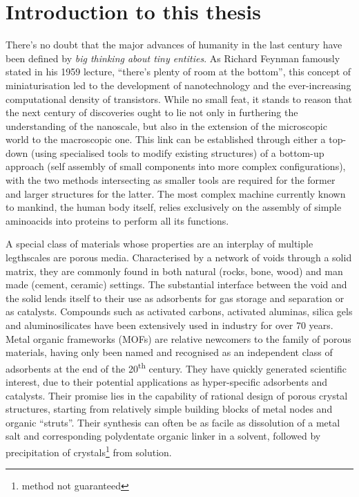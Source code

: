 
\graphicspath{ {\thisch/figures/} }

\chapter*{Introduction to this thesis}\label{intro}

There's no doubt that the major advances of humanity in the last 
century have been defined by \textit{big thinking about tiny entities}.
As Richard Feynman famously stated in his 1959 lecture, 
``there's plenty of room at the bottom'', this concept 
of miniaturisation led to the development of nanotechnology and
the ever-increasing computational density of transistors. 
While no small feat, it stands to reason that the next century of 
discoveries ought to lie not only in furthering the understanding 
of the nanoscale, but also in the extension of the microscopic
world to the macroscopic one. This link can be established through
either a top-down (using specialised tools to modify existing 
structures) of a bottom-up approach (self assembly of small 
components into more complex configurations), with the two 
methods intersecting as smaller tools are required for the 
former and larger structures for the latter. The most complex machine
currently known to mankind, the human body itself, relies 
exclusively on the assembly of simple aminoacids into proteins 
to perform all its functions.

A special class of materials whose properties are an interplay 
of multiple legthscales are porous media. Characterised by
a network of voids through a solid matrix, they are 
commonly found in both natural (rocks, bone, wood) and man made 
(cement, ceramic) settings. The substantial interface between the
void and the solid lends itself to their use as adsorbents 
for gas storage and separation or as catalysts. Compounds such as 
activated carbons, activated aluminas, silica gels and aluminosilicates
have been extensively used in industry for over 70 years.
Metal organic frameworks (MOFs) are relative newcomers to the 
family of porous materials, having only been named and 
recognised as an independent class of adsorbents at the end of
the 20\textsuperscript{th} century.
They have quickly generated scientific interest, due to their
potential applications as hyper-specific adsorbents and catalysts.
Their promise lies in the capability of rational design of 
porous crystal structures, starting from relatively simple building
blocks of metal nodes and organic ``struts''. Their synthesis can often
be as facile as dissolution of a metal salt and corresponding
polydentate organic linker in a solvent, followed by precipitation of 
crystals\footnote{method not guaranteed} from solution.

